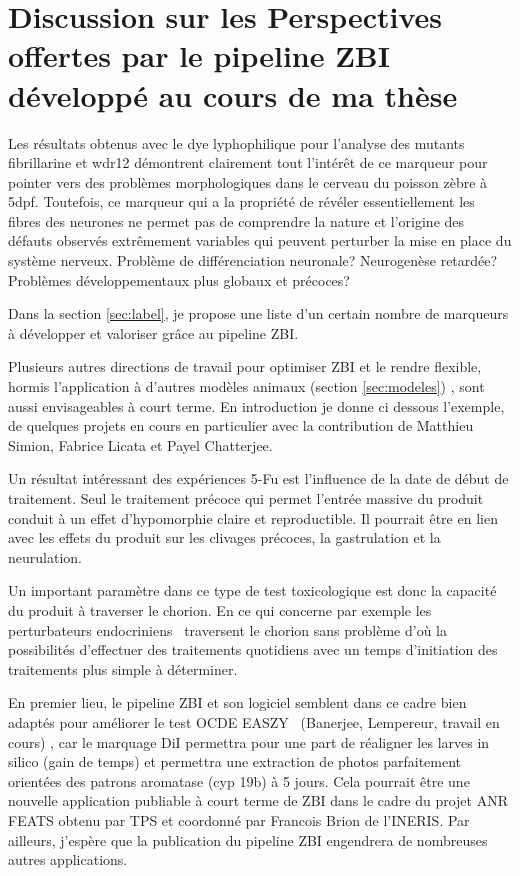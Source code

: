\documentclass[\main/main.tex]{subfiles}
\begin{document}
\section{Discussion sur les Perspectives offertes par le pipeline ZBI développé au cours de ma thèse}
   
%
Les résultats obtenus avec le dye lyphophilique pour l'analyse des mutants fibrillarine et wdr12 démontrent clairement tout l'intérêt de ce marqueur pour pointer vers des problèmes morphologiques dans le cerveau du poisson zèbre à 5dpf.
%
Toutefois, ce marqueur qui a la propriété de révéler essentiellement les fibres des neurones ne permet pas de comprendre la nature et l'origine des défauts observés extrêmement variables qui peuvent perturber la mise en place du système nerveux.
%
Problème de différenciation neuronale? Neurogenèse retardée? Problèmes développementaux plus globaux et précoces? 

%
Dans la section \ref{sec:label}, je propose une liste d'un certain nombre de marqueurs à développer et valoriser grâce au pipeline ZBI.

%
Plusieurs autres directions de travail pour optimiser ZBI et le rendre flexible, hormis l'application à d'autres modèles animaux (section \ref{sec:modeles}) , sont aussi envisageables à court terme. En introduction je donne ci dessous l'exemple, de quelques projets en cours en particulier avec la contribution de Matthieu Simion, Fabrice Licata et Payel Chatterjee. 

%
Un résultat intéressant des expériences 5-Fu est l'influence de la date de début de traitement.
%
Seul le traitement précoce qui permet l'entrée massive du produit conduit à un effet d'hypomorphie claire et reproductible. Il pourrait être en lien avec les  effets du produit sur les clivages précoces, la gastrulation et la neurulation.

%
Un important paramètre dans ce type de test toxicologique  est donc la capacité du produit à traverser le chorion. En ce qui concerne par exemple les perturbateurs endocriniens~\cite{brion_2012} traversent le chorion sans problème d'où la possibilités d'effectuer des traitements quotidiens avec un temps d'initiation des traitements  plus simple à déterminer.

En premier lieu, le pipeline ZBI et son logiciel semblent dans ce cadre  bien  adaptés pour améliorer le test OCDE EASZY~\cite{brion_2019} (Banerjee, Lempereur, travail en cours) , car le marquage DiI permettra pour une part de réaligner les larves in silico (gain de temps) et permettra une extraction de photos parfaitement orientées des patrons aromatase (cyp 19b) à 5 jours. Cela pourrait être une nouvelle application publiable à court terme de ZBI dans le cadre du projet ANR FEATS obtenu par TPS et coordonné par Francois Brion de l'INERIS. Par ailleurs, j'espère que la publication du pipeline ZBI engendrera de nombreuses autres applications.
\end{document}
